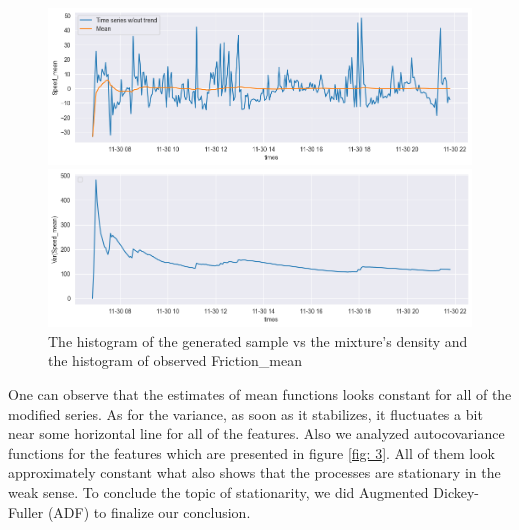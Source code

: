 \documentclass[12pt, bachelor, substylefile = algo_title.rtx]{disser}
\theoremstyle{definition}
\begin{document}
\begin{figure}[!h]
\begin{minipage}{.48\textwidth}
   \end{minipage}
   \begin{minipage}{.48\textwidth}
     \includegraphics[width=\linewidth]{mean5}
   \end{minipage} \hfill
\begin{minipage}{.48\textwidth}
     \includegraphics[width=\linewidth]{var5}
   \end{minipage}
\caption{The histogram of the generated sample vs the mixture's density and the histogram of observed Friction\_mean}
\label{fig: 2}
\end{figure}

One can observe that the estimates of mean functions looks constant for all of the modified series. As for the variance, as soon as it stabilizes, it fluctuates a bit near some horizontal line for all of the features. Also we analyzed autocovariance functions for the features which are presented in figure \ref{fig: 3}. All of them look approximately constant what also shows that the processes are stationary in the weak sense. To conclude the topic of stationarity, we did Augmented Dickey-Fuller (ADF) to finalize our conclusion.  
\end{document}

